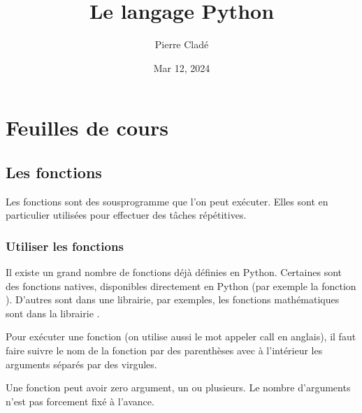 \documentclass[letterpaper,10pt,english]{sphinxhowto}
\title{Le langage Python}
\date{Mar 12, 2024}
\author{Pierre Cladé}
\begin{document}
\pagestyle{empty}
\sphinxmaketitle
\pagestyle{plain}

\pagestyle{normal}
\label{\detokenize{index::doc}}



\section{Feuilles de cours}
\label{\detokenize{feuilles_de_cours:feuilles-de-cours}}\label{\detokenize{feuilles_de_cours::doc}}

\subsection{Les fonctions}
\label{\detokenize{cours1_fonctions_cours:les-fonctions}}\label{\detokenize{cours1_fonctions_cours::doc}}
\sphinxAtStartPar
Les fonctions sont des sous\sphinxhyphen{}programme que l’on peut exécuter. Elles sont en particulier utilisées pour effectuer des tâches répétitives.


\subsubsection{Utiliser les fonctions}
\label{\detokenize{cours1_fonctions_cours:utiliser-les-fonctions}}
\sphinxAtStartPar
Il existe un grand nombre de fonctions déjà définies en Python. Certaines sont des fonctions natives, disponibles directement en Python (par exemple la fonction ). D’autres sont dans une librairie, par exemples, les fonctions mathématiques sont dans la librairie .

\sphinxAtStartPar
Pour exécuter une fonction (on utilise aussi le mot appeler \sphinxhyphen{} call en anglais), il faut faire suivre le nom de la fonction par des parenthèses avec à l’intérieur les arguments séparés par des virgules.

\sphinxAtStartPar
Une fonction peut avoir zero argument, un ou plusieurs. Le nombre d’arguments n’est pas forcement fixé à l’avance.

\begin{sphinxVerbatim}[commandchars=\\\{\}]
 

    
 

  
\end{sphinxVerbatim}
\end{document}
